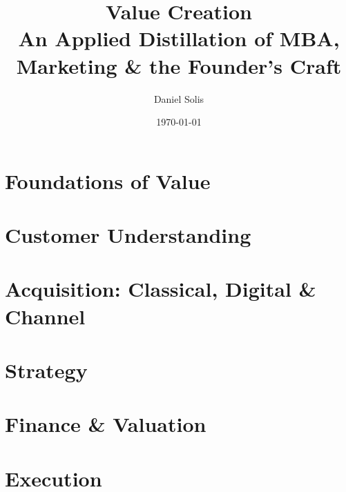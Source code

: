 \documentclass[11pt,a4paper]{scrbook}
\title{\textbf{Value Creation}\\[0.4em]\large An Applied Distillation of MBA, Marketing \& the Founder's Craft}
\author{Daniel Solis}
\date{\today}
\begin{document}
\frontmatter
\maketitle
\tableofcontents

\mainmatter

\part{Foundations of Value}





\part{Customer Understanding}






\part{Acquisition: Classical, Digital \& Channel}





\part{Strategy}





\part{Finance \& Valuation}







\part{Execution}



\end{document}

